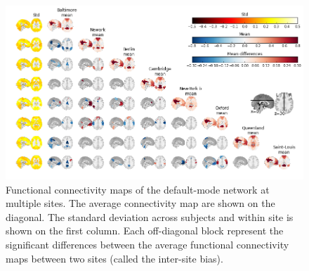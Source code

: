 \documentclass[authoryear]{elsarticle}
\begin{document}
\begin{figure}[tbp]
\begin{center}
\includegraphics[width=\linewidth]{../figures/pccmap_multisite.png}
\end{center}
\caption[DMN variability across sites]{
Functional connectivity maps of the default-mode network at multiple sites. The average connectivity map are shown on the diagonal. The standard deviation across subjects and within site is shown on the first column. Each off-diagonal block represent the significant differences between the average functional connectivity maps between two sites (called the inter-site bias).
}
\label{fig_DMN_variability}
\end{figure}
\end{document}
